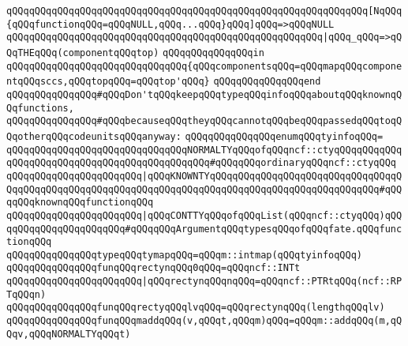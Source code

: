 \verb|qQQqqQQqqQQqqQQqqQQqqQQqqQQqqQQqqQQqqQQqqQQqqQQqqQQqqQQqqQQqqQQq[NqQQq{qQQqfunctionqQQq=qQQqNULL,qQQq...qQQq}qQQq]qQQq=>qQQqNULL|\newline
\verb|qQQqqQQqqQQqqQQqqQQqqQQqqQQqqQQqqQQqqQQqqQQqqQQqqQQqqQQq|\verb#|qQQq_qQQq=>qQQqTHEqQQq(componentqQQqtop)#\newline
\verb|qQQqqQQqqQQqqQQqin|\newline
\verb|qQQqqQQqqQQqqQQqqQQqqQQqqQQqqQQq{qQQqcomponentsqQQq=qQQqmapqQQqcomponentqQQqsccs,qQQqtopqQQq=qQQqtop'qQQq}|\newline
\verb|qQQqqQQqqQQqqQQqend|\newline
\newline
\verb|qQQqqQQqqQQqqQQq#qQQqDon'tqQQqkeepqQQqtypeqQQqinfoqQQqaboutqQQqknownqQQqfunctions,|\newline
\verb|qQQqqQQqqQQqqQQq#qQQqbecauseqQQqtheyqQQqcannotqQQqbeqQQqpassedqQQqtoqQQqotherqQQqcodeunitsqQQqanyway:|\newline
\verb|qQQqqQQqqQQqqQQqenumqQQqtyinfoqQQq=|\newline
\verb|qQQqqQQqqQQqqQQqqQQqqQQqqQQqqQQqNORMALTYqQQqofqQQqncf::ctyqQQqqQQqqQQqqQQqqQQqqQQqqQQqqQQqqQQqqQQqqQQqqQQq#qQQqqQQqordinaryqQQqncf::ctyqQQq|\newline
\verb|qQQqqQQqqQQqqQQqqQQqqQQq|\verb#|qQQqKNOWNTYqQQqqQQqqQQqqQQqqQQqqQQqqQQqqQQqqQQqqQQqqQQqqQQqqQQqqQQqqQQqqQQqqQQqqQQqqQQqqQQqqQQqqQQqqQQqqQQqqQQq#\verb|#qQQqqQQqknownqQQqfunctionqQQq|\newline
\verb|qQQqqQQqqQQqqQQqqQQqqQQq|\verb#|qQQqCONTTYqQQqofqQQqList(qQQqncf::ctyqQQq)qQQqqQQqqQQqqQQqqQQqqQQq#\verb|#qQQqqQQqArgumentqQQqtypesqQQqofqQQqfate.qQQqfunctionqQQq|\newline
\newline
\verb|qQQqqQQqqQQqqQQqtypeqQQqtymapqQQq=qQQqm::intmap(qQQqtyinfoqQQq)|\newline
\newline
\verb|qQQqqQQqqQQqqQQqfunqQQqrectynqQQq0qQQq=qQQqncf::INTt|\newline
\verb|qQQqqQQqqQQqqQQqqQQqqQQq|\verb#|qQQqrectynqQQqnqQQq=qQQqncf::PTRtqQQq(ncf::RPTqQQqn)#\newline
\newline
\verb|qQQqqQQqqQQqqQQqfunqQQqrectyqQQqlvqQQq=qQQqrectynqQQq(lengthqQQqlv)|\newline
\newline
\verb|qQQqqQQqqQQqqQQqfunqQQqmaddqQQq(v,qQQqt,qQQqm)qQQq=qQQqm::addqQQq(m,qQQqv,qQQqNORMALTYqQQqt)|\newline
\newline
